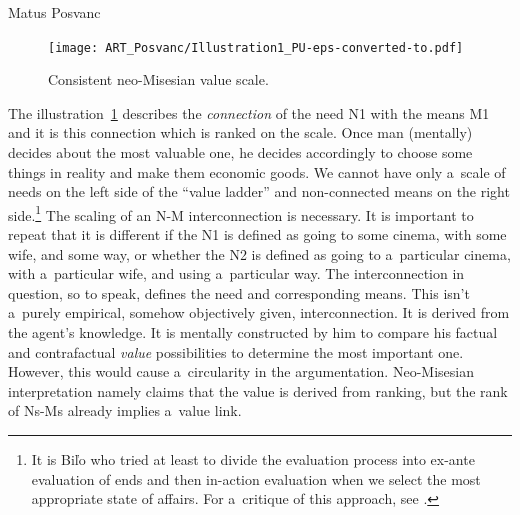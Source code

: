 \begin{artengenv}{Matus Posvanc}
\begin{figure}
 \begin{center}
 \texttt{[image: ART\_Posvanc/Illustration1\_PU-eps-converted-to.pdf]}%
 \end{center}%
 \caption{Consistent neo-Misesian value scale.}\label{pos:fig1}
\end{figure}




The illustration~\ref{pos:fig1} describes the \textit{connection} of the need N1 with the means M1 and it is this connection which is ranked on the scale. Once man (mentally) decides about the most valuable one, he decides accordingly to choose some things in reality and make them economic goods. We cannot have only a~scale of needs on the left side of the ``value ladder'' and non-connected means on the right side.\footnote{It is Biľo 
\parencite*[][]{Bilo2004Theory} %
 who tried at least to divide the evaluation process into ex-ante evaluation of ends and then in-action evaluation when we select the most appropriate state of affairs. For a~critique of this approach, see 
\parencite[][]{Posvanc2019Evolutionary}.%
} The scaling of an N-M interconnection is necessary. It is important to repeat that it is different if the N1 is defined as going to some cinema, with some wife, and some way, or whether the N2 is defined as going to a~particular cinema, with a~particular wife, and using a~particular way. The interconnection in question, so to speak, defines the need and corresponding means. This isn't a~purely empirical, somehow objectively given, interconnection. It is derived from the agent's knowledge. It is mentally constructed by him to compare his factual and contrafactual \textit{value} possibilities to determine the most important one. However, this would cause a~circularity in the argumentation. Neo-Misesian interpretation namely claims that the value is derived from ranking, but the rank of Ns-Ms already implies a~value link.




\end{artengenv}
